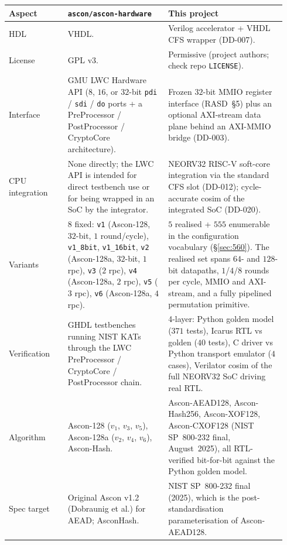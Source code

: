 \documentclass[11pt,a4paper]{article}
\begin{document}
\begin{center}
\begin{longtable}{p{0.20\linewidth}p{0.34\linewidth}p{0.40\linewidth}}
\toprule
\rowcolor{tabhead!20}\textbf{Aspect} & \textbf{\texttt{ascon/ascon-hardware}} & \textbf{This project}\\
\midrule
HDL              & VHDL.                                               & Verilog accelerator + VHDL CFS wrapper (DD-007).\\
License          & GPL v3.                                              & Permissive (project authors; check repo \texttt{LICENSE}).\\
Interface        & GMU LWC Hardware API ($8$, $16$, or $32$-bit \texttt{pdi} / \texttt{sdi} / \texttt{do} ports + a PreProcessor / PostProcessor / CryptoCore architecture). & Frozen $32$-bit MMIO register interface (RASD~§5) plus an optional AXI-stream data plane behind an AXI-MMIO bridge (DD-003).\\
CPU integration  & None directly; the LWC API is intended for direct testbench use or for being wrapped in an SoC by the integrator. & NEORV32 RISC-V soft-core integration via the standard CFS slot (DD-012); cycle-accurate cosim of the integrated SoC (DD-020).\\
Variants         & $8$ fixed: \texttt{v1} (Ascon-128, $32$-bit, $1$ round/cycle), \texttt{v1\_8bit}, \texttt{v1\_16bit}, \texttt{v2} (Ascon-128a, $32$-bit, $1$ rpc), \texttt{v3} ($2$ rpc), \texttt{v4} (Ascon-128a, $2$ rpc), \texttt{v5} ($3$ rpc), \texttt{v6} (Ascon-128a, $4$ rpc). & $5$ realised + $555$ enumerable in the configuration vocabulary (§\ref{sec:560}). The realised set spans $64$- and $128$-bit datapaths, $1$/$4$/$8$ rounds per cycle, MMIO and AXI-stream, and a fully pipelined permutation primitive.\\
Verification     & GHDL testbenches running NIST KATs through the LWC PreProcessor / CryptoCore / PostProcessor chain. & 4-layer: Python golden model ($371$ tests), Icarus RTL vs golden ($40$ tests), C driver vs Python transport emulator ($4$ cases), Verilator cosim of the full NEORV32 SoC driving real RTL.\\
Algorithm        & Ascon-128 ($v_1$, $v_3$, $v_5$), Ascon-128a ($v_2$, $v_4$, $v_6$), Ascon-Hash. & Ascon-AEAD128, Ascon-Hash256, Ascon-XOF128, Ascon-CXOF128 (NIST SP~800-232 final, August~2025), all RTL-verified bit-for-bit against the Python golden model.\\
Spec target      & Original Ascon v1.2 (Dobraunig et al.) for AEAD; AsconHash. & NIST SP~800-232 final (2025), which is the post-standardisation parameterisation of Ascon-AEAD128.\\
\bottomrule
\end{longtable}
\end{center}
\end{document}
